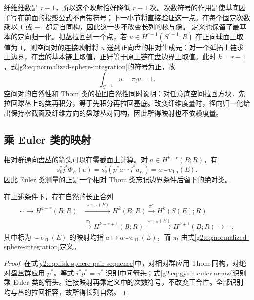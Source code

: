 纤维维数是 \(r-1\)，所以这个映射恰好降低 \(r-1\) 次。次数符号的作用是使基底因子写在前面的投影公式不再带符号；下一小节将直接验证这一点。在每个固定次数乘以 \(1\) 或 \(-1\) 都是自同构，因此这一步不改变长列的核与像。
\ProseParagraphBreak
定义也保留了最基本的定向归一化。把丛拉回到一个点，若 \(u\in H^{r-1}(S^{r-1};R)\) 在正向球面上取值为 \(1\)，则空间对的连接映射将 \(u\) 送到正向盘的相对生成元：对一个延拓上链求上边界，在盘的基本链上取值，正好等于原上链在盘边界上取值。此时 \(k=r-1\)，式\eqref{g2:eq:normalized-sphere-integration}的符号为正，故
\begin{equation}\label{g2:eq:gysin-fiber-normalization}
	\int_{S^{r-1}}u=\pi_!u=1.
\end{equation}
空间对的自然性和 Thom 类的拉回自然性同时说明：对任意底空间拉回方块，先拉回球丛上的类再积分，等于先积分再拉回基底。改变纤维度量时，径向归一化给出保持零截面及纤维方向的盘球丛对同构，因此所得映射也不依赖度量。

\subsection{乘 Euler 类的映射}
\label{g2:subsec:2004:02}
相对群通向盘丛的箭头可以在零截面上计算。对 \(a\in H^{k-r}(B;R)\)，有
\begin{equation}\label{g2:eq:gysin-euler-arrow}
	s_0^*j^*\Phi_E(a)=s_0^*(p^*a\smile j^*u_E)=a\smile e_{\mathrm{Th}}(E).
\end{equation}
因此 Euler 类测量的正是一个相对 Thom 类忘记边界条件后留下的绝对类。

\begin{theorem}[Gysin 序列]\label{g2:thm:thom-gysin}
	在上述条件下，存在自然的长正合列
	\begin{equation}\label{g2:eq:thom-gysin-sequence}
		\begin{aligned}
			\cdots\longrightarrow H^{k-r}(B;R)&\xrightarrow{\ \smile e_{\mathrm{Th}}(E)\ }H^k(B;R)\xrightarrow{\pi^*}H^k(S(E);R)\\
			&\xrightarrow{\pi_!}H^{k-r+1}(B;R)\xrightarrow{\ \smile e_{\mathrm{Th}}(E)\ }H^{k+1}(B;R)\longrightarrow\cdots,
		\end{aligned}
	\end{equation}
	其中标为 \(\smile e_{\mathrm{Th}}(E)\) 的映射均指 \(a\mapsto a\smile e_{\mathrm{Th}}(E)\)，而 \(\pi_!\) 由式\eqref{g2:eq:normalized-sphere-integration}定义。
\end{theorem}
\begin{proof}
	在式\eqref{g2:eq:disk-sphere-pair-sequence}中，对相对群应用 Thom 同构，对绝对盘丛群应用 \(p^*\)。等式 \(i^*p^*=\pi^*\) 识别中间箭头；式\eqref{g2:eq:gysin-euler-arrow}识别乘 Euler 类的箭头。连接映射再乘定义中的次数符号，不改变正合性。全部识别均与丛的拉回相容，故所得长列自然。
\end{proof}

